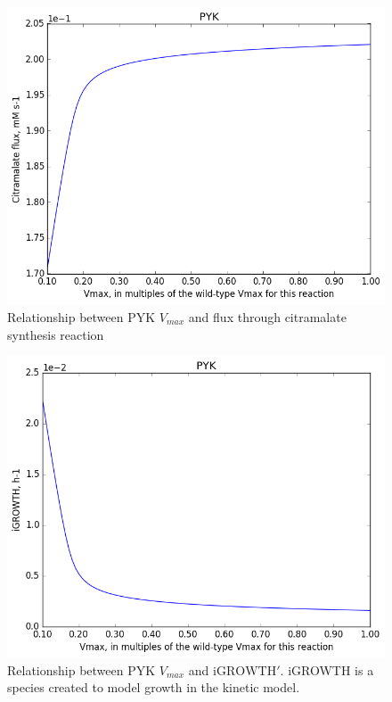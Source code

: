 \documentclass[parskip=full, numbers=noenddot]{scrreprt}
\begin{document}
\begin{figure}[htbp]
  \centering
  \includegraphics[scale=0.4]{issues_citraflux}
  \caption{Relationship between PYK $V_{max}$ and flux through citramalate synthesis reaction}
  \label{fig:issues_citraflux}
\end{figure}

\begin{figure}[htbp]
  \centering
  \includegraphics[scale=0.4]{issues_igrowth}
  \caption{Relationship between PYK $V_{max}$ and $\mathrm{iGROWTH}'$. iGROWTH is a species created to model growth in the kinetic model.}
  \label{fig:issues_igrowth}
\end{figure}
\end{document}
